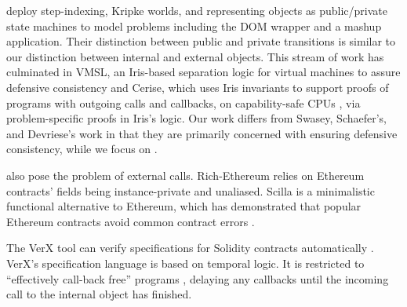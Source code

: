 \citet{dd} deploy step-indexing, Kripke worlds, and representing objects
as public/private state machines to model problems including the 
DOM wrapper and a mashup application.
Their distinction between public and private transitions %
is similar  to our
distinction between internal and external objects.
This stream of work has culminated in VMSL, an Iris-based separation logic for
virtual machines to assure defensive consistency
\cite{vmsl-pldi2023}
%
%
and Cerise, which uses Iris invariants to support proofs of programs with outgoing calls and callbacks,
on capability-safe CPUs \cite{cerise-jacm2024},
via problem-specific proofs in Iris's logic.
Our work differs from Swasey, Schaefer's, and Devriese's work in that
they are primarily concerned   with  ensuring defensive consistency, 
while we focus on .

 also pose the problem of external calls.
Rich-Ethereum \cite{rich-specs-smart-contracts-oopsla2021}
relies on Ethereum contracts' fields being instance-private
and unaliased. %
Scilla \cite{sergey-scilla-oopsla2019}
is a minimalistic functional alternative to Ethereum,
which has demonstrated that popular Ethereum
contracts avoid common contract errors .
%


The VerX tool can verify
specifications for Solidity contracts automatically \cite{VerX}.
VerX's specification language is based on temporal logic.
It %
is restricted to ``effectively call-back free'' programs
\cite{Grossman,relaxed-callbacks-ToDES},
delaying any callbacks until the
incoming call to the internal object has finished.
 
